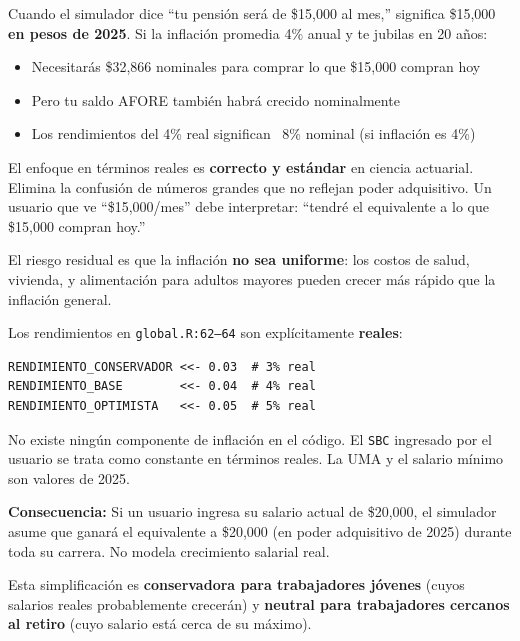 \documentclass[11pt,a4paper]{report}
\begin{document}
\begin{tcolorbox}[colback=green!5!white, colframe=green!50!black, title=\textbf{Intuici\'on: Tu Pensi\'on en Pesos de Hoy}]
Cuando el simulador dice ``tu pensi\'on ser\'a de \$15,000 al mes,'' significa \$15,000 \textbf{en pesos de 2025}. Si la inflaci\'on promedia 4\% anual y te jubilas en 20 a\~nos:
\begin{itemize}
  \item Necesitar\'as \$32,866 nominales para comprar lo que \$15,000 compran hoy
  \item Pero tu saldo AFORE tambi\'en habr\'a crecido nominalmente
  \item Los rendimientos del 4\% real significan ~8\% nominal (si inflaci\'on es 4\%)
\end{itemize}

El enfoque en t\'erminos reales es \textbf{correcto y est\'andar} en ciencia actuarial. Elimina la confusi\'on de n\'umeros grandes que no reflejan poder adquisitivo. Un usuario que ve ``\$15,000/mes'' debe interpretar: ``tendr\'e el equivalente a lo que \$15,000 compran hoy.''

El riesgo residual es que la inflaci\'on \textbf{no sea uniforme}: los costos de salud, vivienda, y alimentaci\'on para adultos mayores pueden crecer m\'as r\'apido que la inflaci\'on general.
\end{tcolorbox}

\begin{tcolorbox}[colback=orange!5!white, colframe=orange!75!black, title=\textbf{Aplicaci\'on en C\'odigo: Todo en T\'erminos Reales}]
Los rendimientos en \texttt{global.R:62--64} son expl\'icitamente \textbf{reales}:

\begin{lstlisting}
RENDIMIENTO_CONSERVADOR <<- 0.03  # 3% real
RENDIMIENTO_BASE        <<- 0.04  # 4% real
RENDIMIENTO_OPTIMISTA   <<- 0.05  # 5% real
\end{lstlisting}

No existe ning\'un componente de inflaci\'on en el c\'odigo. El \texttt{SBC} ingresado por el usuario se trata como constante en t\'erminos reales. La UMA y el salario m\'inimo son valores de 2025.

\textbf{Consecuencia:} Si un usuario ingresa su salario actual de \$20,000, el simulador asume que ganar\'a el equivalente a \$20,000 (en poder adquisitivo de 2025) durante toda su carrera. No modela crecimiento salarial real.

Esta simplificaci\'on es \textbf{conservadora para trabajadores j\'ovenes} (cuyos salarios reales probablemente crecer\'an) y \textbf{neutral para trabajadores cercanos al retiro} (cuyo salario est\'a cerca de su m\'aximo).
\end{tcolorbox}
\end{document}
